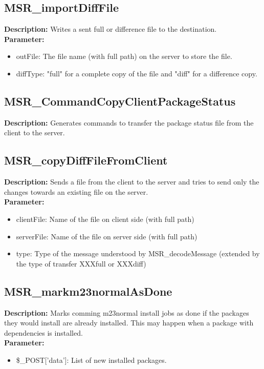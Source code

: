 \subsection{MSR\_importDiffFile}
\textbf{Description:} Writes a sent full or difference file to the destination.\\
\textbf{Parameter:}
\begin{itemize}
\item outFile: The file name (with full path) on the server to store the file.
\item diffType: "full" for a complete copy of the file and "diff" for a difference copy.
\end{itemize}

\subsection{MSR\_CommandCopyClientPackageStatus}
\textbf{Description:} Generates commands to transfer the package status file from the client to the server.\\

\subsection{MSR\_copyDiffFileFromClient}
\textbf{Description:} Sends a file from the client to the server and tries to send only the changes towards an existing file on the server.\\
\textbf{Parameter:}
\begin{itemize}
\item clientFile: Name of the file on client side (with full path)
\item serverFile: Name of the file on server side (with full path)
\item type: Type of the message understood by MSR\_decodeMessage (extended by the type of transfer XXXfull or XXXdiff)
\end{itemize}

\subsection{MSR\_markm23normalAsDone}
\textbf{Description:} Marks comming m23normal install jobs as done if the packages they would install are already installed. This may happen when a package with dependencies is installed.\\
\textbf{Parameter:}
\begin{itemize}
\item \$\_POST['data']: List of new installed packages.
\end{itemize}

